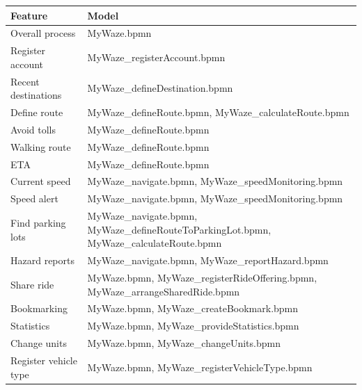 \documentclass{article}
\begin{document}
\begin{longtable}{|>{\raggedright}p{}|>{\raggedright\arraybackslash}p{}|}
\hline
\textbf{Feature} & \textbf{Model} \\
\hline
Overall process & MyWaze.bpmn \\
\hline
Register account & MyWaze\_registerAccount.bpmn \\
\hline
Recent destinations & MyWaze\_defineDestination.bpmn \\
\hline
Define route & MyWaze\_defineRoute.bpmn, MyWaze\_calculateRoute.bpmn \\
\hline
Avoid tolls & MyWaze\_defineRoute.bpmn \\
\hline
Walking route & MyWaze\_defineRoute.bpmn \\
\hline
ETA & MyWaze\_defineRoute.bpmn \\
\hline
Current speed & MyWaze\_navigate.bpmn, MyWaze\_speedMonitoring.bpmn \\
\hline
Speed alert & MyWaze\_navigate.bpmn, MyWaze\_speedMonitoring.bpmn \\
\hline
Find parking lots & MyWaze\_navigate.bpmn, MyWaze\_defineRouteToParkingLot.bpmn, MyWaze\_calculateRoute.bpmn \\
\hline
Hazard reports & MyWaze\_navigate.bpmn, MyWaze\_reportHazard.bpmn \\
\hline
Share ride & MyWaze.bpmn, MyWaze\_registerRideOffering.bpmn, MyWaze\_arrangeSharedRide.bpmn \\
\hline
Bookmarking & MyWaze.bpmn, MyWaze\_createBookmark.bpmn \\
\hline
Statistics & MyWaze.bpmn, MyWaze\_provideStatistics.bpmn \\
\hline
Change units & MyWaze.bpmn, MyWaze\_changeUnits.bpmn \\
\hline
Register vehicle type & MyWaze.bpmn, MyWaze\_registerVehicleType.bpmn \\
\hline
\end{longtable}

\clearpage
\end{document}
